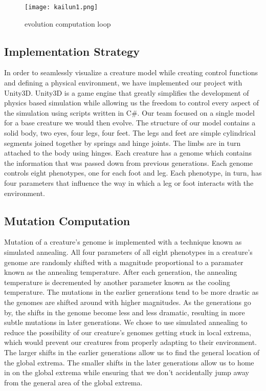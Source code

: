 \documentclass[letterpaper, 10 pt, conference]{ieeeconf}  %
\begin{document}
\begin{figure}
\centering
  \texttt{[image: kailun1.png]}\\
  \caption{evolution computation loop}\label{fig1}
\end{figure}

\subsection{Implementation Strategy}
In order to seamlessly visualize a creature model while creating control functions and defining a physical environment, we have implemented our project with Unity3D. Unity3D is a game engine that greatly simplifies the development of physics based simulation while allowing us the freedom to control every aspect of the simulation using scripts written in C$\#$. Our team focused on a single model for a base creature we would then evolve. The structure of our model contains a solid body, two eyes, four legs, four feet. The legs and feet are simple cylindrical segments joined together by springs and hinge joints. The limbs are in turn attached to the body using hinges. Each creature has a genome which contains the information that was passed down from previous generations. Each genome controls eight phenotypes, one for each foot and leg. Each phenotype, in turn, has four parameters that influence the way in which a leg or foot interacts with the environment.

\subsection{Mutation Computation}
Mutation of a creature's genome is implemented with a technique known as simulated annealing. All four parameters of all eight phenotypes in a creature's genome are randomly shifted with a magnitude proportional to a paramater known as the annealing temperature. After each generation, the annealing temperature is decremented by another parameter known as the cooling temperature. The mutations in the earlier generations tend to be more drastic as the genomes are shifted around with higher magnitudes. As the generations go by, the shifts in the genome become less and less dramatic, resulting in more subtle mutations in later generations. We chose to use simulated annealing to reduce the possibility of our creature's genomes getting stuck in local extrema, which would prevent our creatures from properly adapting to their environment. The larger shifts in the earlier generations allow us to find the general location of the global extrema. The smaller shifts in the later generations allow us to home in on the global extrema while ensuring that we don't accidentally jump away from the general area of the global extrema.
\end{document}
